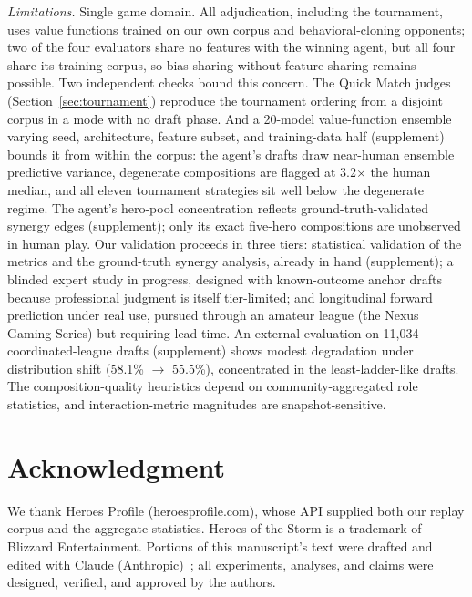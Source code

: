 \documentclass[journal]{IEEEtran}
\newif\ifanonymous
\begin{document}
\textit{Limitations.} Single game domain. All adjudication, including the tournament, uses value functions trained on our own corpus and behavioral-cloning opponents; two of the four evaluators share no features with the winning agent, but all four share its training corpus, so bias-sharing without feature-sharing remains possible. Two independent checks bound this concern. The Quick Match judges (Section~\ref{sec:tournament}) reproduce the tournament ordering from a disjoint corpus in a mode with no draft phase. And a 20-model value-function ensemble varying seed, architecture, feature subset, and training-data half (supplement) bounds it from within the corpus: the agent's drafts draw near-human ensemble predictive variance, degenerate compositions are flagged at 3.2$\times$ the human median, and all eleven tournament strategies sit well below the degenerate regime. The agent's hero-pool concentration reflects ground-truth-validated synergy edges (supplement); only its exact five-hero compositions are unobserved in human play. Our validation proceeds in three tiers: statistical validation of the metrics and the ground-truth synergy analysis, already in hand (supplement); a blinded expert study in progress, designed with known-outcome anchor drafts because professional judgment is itself tier-limited; and longitudinal forward prediction under real use, pursued through an amateur league (the Nexus Gaming Series) but requiring lead time. An external evaluation on 11{,}034 coordinated-league drafts (supplement) shows modest degradation under distribution shift (58.1\% $\to$ 55.5\%), concentrated in the least-ladder-like drafts. The composition-quality heuristics depend on community-aggregated role statistics, and interaction-metric magnitudes are snapshot-sensitive.

\ifanonymous
\section*{AI Disclosure}

Portions of this manuscript's text were drafted and edited with Claude (Anthropic)~\cite{claude}; all experiments, analyses, and claims were designed, verified, and approved by the authors.
\else
\section*{Acknowledgment}

We thank Heroes Profile (heroesprofile.com), whose API supplied both our replay corpus and the aggregate statistics. Heroes of the Storm is a trademark of Blizzard Entertainment. Portions of this manuscript's text were drafted and edited with Claude (Anthropic)~\cite{claude}; all experiments, analyses, and claims were designed, verified, and approved by the authors.
\fi
\end{document}
